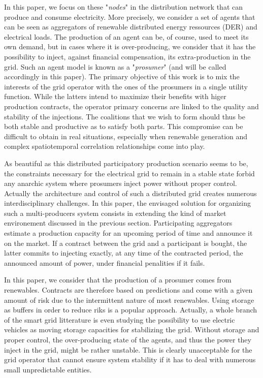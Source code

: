 \documentclass[conference]{IEEEtran}
\begin{document}

In this paper, we focus on these "\textit{nodes}" in the distribution network that can produce and consume electricity. More precisely, we consider a set of agents that can be seen as aggregators of renewable distributed energy ressources (DER) and electrical loads. The production of an agent can be, of course, used to meet its own demand, but in cases where it is over-producing, we consider that it has the possibility to inject, against financial compensation, its extra-production in the grid. Such an agent model is known as a "\textit{prosumer}" \cite{Rathnayaka2012} (and will be called accordingly in this paper). The primary objective of this work is to mix the interests of the grid operator with the ones of the prosumers in a single utility function. While the latters intend to maximize their benefits with higer production contracts, the operator primary concerns are linked to the quality and stability of the injections. The coalitions that we wish to form should thus be both stable and productive as to satisfy both parts. This compromise can be difficult to obtain in real situations, especially when renewable generation and complex spatiotemporal correlation relationships come into play.

As beautiful as this distributed participatory production scenario seems to be, the constraints necessary for the electrical grid to remain in a stable state forbid any anarchic system where prosumers inject power without proper control. Actually the architecture and control of such a distributed grid creates numerous interdisciplinary challenges. In this paper, the envisaged solution for organizing such a multi-producers system consists in extending the kind of market environement discussed in the previous section. Participating aggregators estimate a production capacity for an upcoming period of time and announce it on the market. If a contract between the grid and a participant is bought, the latter commits to injecting exactly, at any time of the contracted period, the announced amount of power, under financial penalities if it fails.

In this paper, we consider that the production of a prosumer comes from renewables. Contracts are therefore based on predictions and come with a given amount of risk due to the intermittent nature of most renewables. Using storage as buffers in order to reduce riks is a popular approach. Actually, a whole branch of the smart grid litterature is even studying the possibility to use electric vehicles as moving storage capacities for stabilizing the grid. Without storage and proper control, the over-producing state of the agents, and thus the power they inject in the grid, might be rather unstable. This is clearly unacceptable for the grid operator that cannot ensure system stability if it has to deal with numerous small unpredictable entities.
\end{document}
